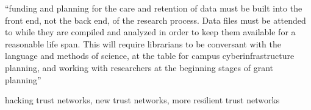 \documentclass{acm_proc_article-sp}
\begin{document}
``funding and planning for the care and retention of data must be
built into the front end, not the back end, of the research
process. Data files must be attended to while they are compiled and
analyzed in order to keep them available for a reasonable life
span. This will require librarians to be conversant with the language
and methods of science, at the table for campus cyberinfrastructure
planning, and working with researchers at the beginning stages of
grant planning'' \cite{ogburn:imperative}

hacking trust networks, new trust networks, more resilient trust networks

{}



\end{document}
